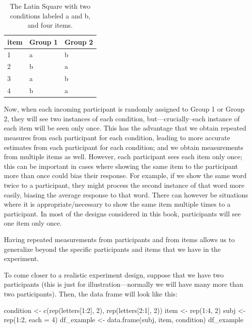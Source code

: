 \documentclass[
  12pt,
]{krantz}
\newenvironment{Shaded}{\begin{snugshade}}{\end{snugshade}}
\newcommand{\AttributeTok}[1]{\textcolor[rgb]{0.77,0.63,0.00}{#1}}
\newcommand{\DecValTok}[1]{\textcolor[rgb]{0.00,0.00,0.81}{#1}}
\newcommand{\FunctionTok}[1]{\textcolor[rgb]{0.00,0.00,0.00}{#1}}
\newcommand{\NormalTok}[1]{#1}
\newcommand{\OtherTok}[1]{\textcolor[rgb]{0.56,0.35,0.01}{#1}}
\newcommand{\SpecialCharTok}[1]{\textcolor[rgb]{0.00,0.00,0.00}{#1}}
\theoremstyle{definition}
\theoremstyle{definition}
\theoremstyle{definition}
\theoremstyle{definition}
\theoremstyle{remark}
\begin{document}
\begin{table}

\caption{\label{tab:LatinSquarerep2}The Latin Square with two conditions labeled a and b, and four items.}
\centering
\begin{tabular}[t]{lll}
\toprule
item & Group 1 & Group 2\\
\midrule
1 & a & b\\
2 & b & a\\
3 & a & b\\
4 & b & a\\
\bottomrule
\end{tabular}
\end{table}

Now, when each incoming participant is randomly assigned to Group 1 or Group 2, they will see two instances of each condition, but---crucially--each instance of each item will be seen only once. This has the advantage that we obtain repeated measures from each participant for each condition, leading to more accurate estimates from each participant for each condition; and we obtain measurements from multiple items as well. However, each participant sees each item only once; this can be important in cases where showing the same item to the participant more than once could bias their response. For example, if we show the same word twice to a participant, they might process the second instance of that word more easily, biasing the average response to that word. There can however be situations where it is appropriate/necessary to show the same item multiple times to a participant. In most of the designs considered in this book, participants will see one item only once.

Having repeated measurements from participants and from items allows us to generalize beyond the specific participants and items that we have in the experiment.

To come closer to a realistic experiment design, suppose that we have two participants (this is just for illustration---normally we will have many more than two participants). Then, the data frame will look like this:

\begin{Shaded}
\begin{Highlighting}[]
\NormalTok{condition }\OtherTok{\textless{}{-}} \FunctionTok{c}\NormalTok{(}\FunctionTok{rep}\NormalTok{(letters[}\DecValTok{1}\SpecialCharTok{:}\DecValTok{2}\NormalTok{], }\DecValTok{2}\NormalTok{), }\FunctionTok{rep}\NormalTok{(letters[}\DecValTok{2}\SpecialCharTok{:}\DecValTok{1}\NormalTok{], }\DecValTok{2}\NormalTok{))}
\NormalTok{item }\OtherTok{\textless{}{-}} \FunctionTok{rep}\NormalTok{(}\DecValTok{1}\SpecialCharTok{:}\DecValTok{4}\NormalTok{, }\DecValTok{2}\NormalTok{)}
\NormalTok{subj }\OtherTok{\textless{}{-}} \FunctionTok{rep}\NormalTok{(}\DecValTok{1}\SpecialCharTok{:}\DecValTok{2}\NormalTok{, }\AttributeTok{each =} \DecValTok{4}\NormalTok{)}
\NormalTok{df\_example }\OtherTok{\textless{}{-}} \FunctionTok{data.frame}\NormalTok{(subj, item, condition)}
\NormalTok{df\_example}
\end{Highlighting}
\end{Shaded}
\end{document}
